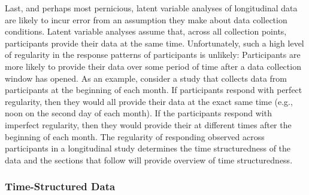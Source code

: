 \documentclass[
12pt, %
twoside,
english]{guelphthesis}
\begin{document}
Last, and perhaps most pernicious, latent variable analyses of longitudinal data are likely to incur error from an assumption they make about data collection conditions. Latent variable analyses assume that, across all collection points, participants provide their data at the same time. Unfortunately, such a high level of regularity in the response patterns of participants is unlikely: Participants are more likely to provide their data over some period of time after a data collection window has opened. As an example, consider a study that collects data from participants at the beginning of each month. If participants respond with perfect regularity, then they would all provide their data at the exact same time (e.g., noon on the second day of each month). If the participants respond with imperfect regularity, then they would provide their at different times after the beginning of each month. The regularity of responding observed across participants in a longitudinal study determines the time structuredness of the data and the sections that follow will provide overview of time structuredness.

\hypertarget{time-structured-data}{%
\subsubsection{Time-Structured Data}\label{time-structured-data}}
\end{document}
